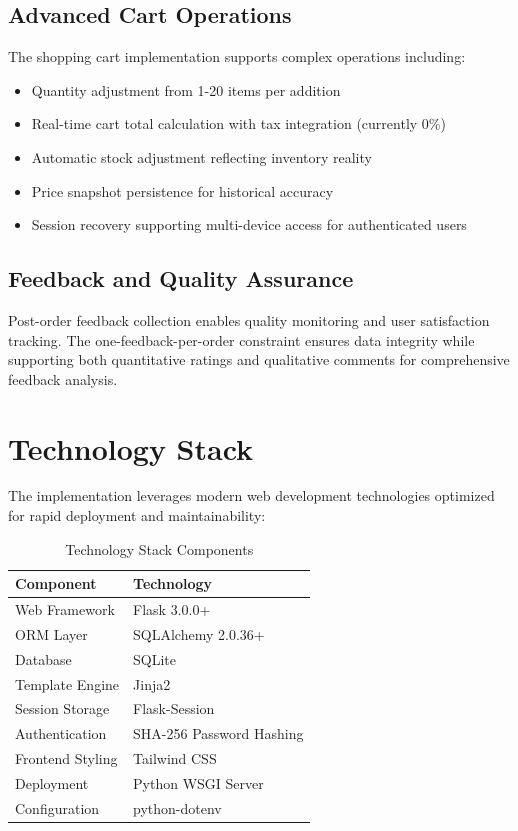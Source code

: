 \documentclass{ieeeaccess}
\begin{document}
\subsection{Advanced Cart Operations}
The shopping cart implementation supports complex operations including:
\begin{itemize}
\item Quantity adjustment from 1-20 items per addition
\item Real-time cart total calculation with tax integration (currently 0\%)
\item Automatic stock adjustment reflecting inventory reality
\item Price snapshot persistence for historical accuracy
\item Session recovery supporting multi-device access for authenticated users
\end{itemize}

\subsection{Feedback and Quality Assurance}
Post-order feedback collection enables quality monitoring and user satisfaction tracking. The one-feedback-per-order constraint ensures data integrity while supporting both quantitative ratings and qualitative comments for comprehensive feedback analysis.

\section{Technology Stack}
\label{sec:tech}

The implementation leverages modern web development technologies optimized for rapid deployment and maintainability:

\begin{table}[H]
\centering
\caption{Technology Stack Components}
\begin{tabular}{ll}
\toprule
\textbf{Component} & \textbf{Technology} \\
\midrule
Web Framework & Flask 3.0.0+ \\
ORM Layer & SQLAlchemy 2.0.36+ \\
Database & SQLite \\
Template Engine & Jinja2 \\
Session Storage & Flask-Session \\
Authentication & SHA-256 Password Hashing \\
Frontend Styling & Tailwind CSS \\
Deployment & Python WSGI Server \\
Configuration & python-dotenv \\
\bottomrule
\end{tabular}
\label{tab:tech_stack}
\end{table}
\end{document}
